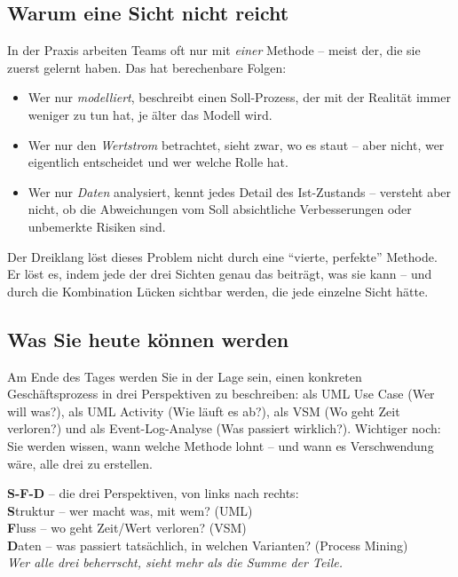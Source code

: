 \documentclass[11pt,a4paper,oneside]{article}
\newcommand{\caveatfontfallback}{\itshape}
\newcommand\caveatfont{\caveatfontfallback}%
\newcommand{\akzent}[1]{{\caveatfont\color{lpAmber}#1}}
\begin{document}
\subsection{Warum eine Sicht nicht reicht}

In der Praxis arbeiten Teams oft nur mit \emph{einer} Methode -- meist der, die sie zuerst gelernt haben. Das hat berechenbare Folgen:

\begin{itemize}
  \item Wer nur \emph{modelliert}, beschreibt einen Soll-Prozess, der mit der Realität immer weniger zu tun hat, je älter das Modell wird.
  \item Wer nur den \emph{Wertstrom} betrachtet, sieht zwar, wo es staut -- aber nicht, wer eigentlich entscheidet und wer welche Rolle hat.
  \item Wer nur \emph{Daten} analysiert, kennt jedes Detail des Ist-Zustands -- versteht aber nicht, ob die Abweichungen vom Soll absichtliche Verbesserungen oder unbemerkte Risiken sind.
\end{itemize}

Der Dreiklang löst dieses Problem nicht durch eine ``vierte, perfekte'' Methode. Er löst es, indem jede der drei Sichten genau das beiträgt, was sie kann -- und durch die Kombination Lücken sichtbar werden, die jede einzelne Sicht hätte.

\subsection{Was Sie heute können werden}

Am Ende des Tages werden Sie in der Lage sein, einen konkreten Geschäftsprozess in drei Perspektiven zu beschreiben: als UML Use Case (Wer will was?), als UML Activity (Wie läuft es ab?), als VSM (Wo geht Zeit verloren?) und als Event-Log-Analyse (Was passiert wirklich?). Wichtiger noch: Sie werden wissen, wann welche Methode lohnt -- und wann es Verschwendung wäre, alle drei zu erstellen.

\begin{eselsbox}[Eselsbrücke: \akzent{S-F-D}]
\textbf{S-F-D} -- die drei Perspektiven, von links nach rechts:\\[2pt]
\textbf{S}truktur -- wer macht was, mit wem? (UML)\\
\textbf{F}luss -- wo geht Zeit/Wert verloren? (VSM)\\
\textbf{D}aten -- was passiert tatsächlich, in welchen Varianten? (Process Mining)\\[2pt]
\emph{Wer alle drei beherrscht, sieht mehr als die Summe der Teile.}
\end{eselsbox}
\end{document}
